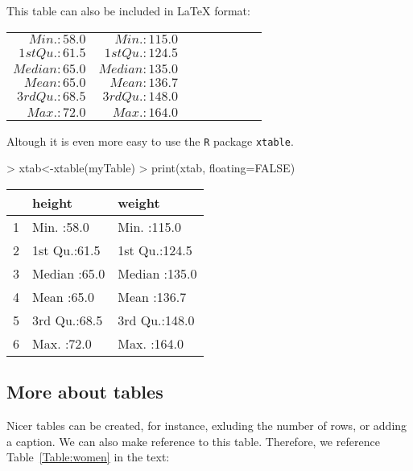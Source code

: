 \documentclass[11pt]{article}
\begin{document}
\noindent This table can also be included in LaTeX format:


\begin{center}
\begin{tabular}{rrrrrrrr} 

$ Min.   :58.0   $&$ Min.   :115.0   $\\
$ 1st Qu.:61.5   $&$ 1st Qu.:124.5   $\\
$ Median :65.0   $&$ Median :135.0   $\\
$ Mean   :65.0   $&$ Mean   :136.7   $\\
$ 3rd Qu.:68.5   $&$ 3rd Qu.:148.0   $\\
$ Max.   :72.0   $&$ Max.   :164.0   $\\\end{tabular}
\end{center}

\noindent Altough it is even more easy to use the {\tt R} package {\tt xtable}. 

\begin{Schunk}
\begin{Sinput}
> xtab<-xtable(myTable)
> print(xtab, floating=FALSE)
\end{Sinput}
% latex table generated in R 3.0.3 by xtable 1.7-4 package
% Mon Oct  6 08:45:20 2014
\begin{tabular}{rll}
  \hline
 &     height &     weight \\ 
  \hline
1 & Min.   :58.0   & Min.   :115.0   \\ 
  2 & 1st Qu.:61.5   & 1st Qu.:124.5   \\ 
  3 & Median :65.0   & Median :135.0   \\ 
  4 & Mean   :65.0   & Mean   :136.7   \\ 
  5 & 3rd Qu.:68.5   & 3rd Qu.:148.0   \\ 
  6 & Max.   :72.0   & Max.   :164.0   \\ 
   \hline
\end{tabular}\end{Schunk}


\subsection{More about tables}

Nicer tables can be created, for instance, exluding the number of rows, or adding a caption. We can also make reference to this
table. Therefore, we reference  Table~\ref{Table:women} in the text:
\end{document}
